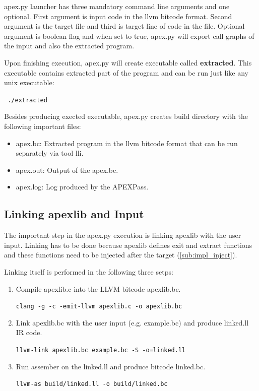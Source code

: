\documentclass[12pt, twoside]{fithesis2}
\renewcommand{\_}{\leavevmode \kern0.07em\vbox{\hrule width0.4em}}
\newcommand{\squarebullet}{\textcolor{black}{\raisebox{0.15em}{\rule{4pt}{4pt}}}}
\newenvironment{myItemize}{
  \begin{itemize}[
    leftmargin=2em,
    rightmargin=1em,
    itemsep=\parskip,
    parsep=0em,
    topsep=0em,
    partopsep=0em
]
  \renewcommand{\labelitemi}{\squarebullet}
  \renewcommand{\labelitemii}{\textbullet}
}{
  \end{itemize}
}
\newenvironment{myEnumerate}{
  \begin{enumerate}[
    leftmargin=2em,
    rightmargin=1em,
    itemsep=\parskip,
    parsep=0em,
    topsep=0em,
    partopsep=0em
]
}{
  \end{enumerate}
}
\begin{document}
apex.py launcher has three mandatory command line arguments and one optional.
First argument is input code in the llvm bitcode format. Second argument is the
target file and third is target line of code in the file.
Optional argument is boolean flag and when set to true, apex.py will
export call graphs of the input and also the extracted program.

Upon finishing execution, apex.py will create executable called
\textbf{extracted}. This executable contains extracted part of the program and
can be run just like any unix executable:

\texttt{
./extracted
}

Besides producing exected executable, apex.py creates build directory with the
following important files:

\begin{myItemize}
\item apex.bc: Extracted program in the llvm bitcode format that can be run separately
via tool lli.
\item apex.out: Output of the apex.bc.
\item apex.log: Log produced by the APEXPass.
\end{myItemize}

\subsection{Linking apexlib and Input}

The important step in the apex.py execution is linking apexlib with the user
input. Linking has to be done because apexlib defines exit and extract
functions and these functions need to be injected after the target
(\autoref{sub:impl_inject}).

Linking itself is performed in the following three setps:
\begin{myEnumerate}
\item Compile apexlib.c into the LLVM bitcode apexlib.bc.

\texttt{clang -g -c -emit-llvm apexlib.c -o apexlib.bc}

\item Link apexlib.bc with the user input (e.g. example.bc) and produce linked.ll
IR code.

\texttt{llvm-link apexlib.bc example.bc -S -o=linked.ll}

\item Run assember on the linked.ll and produce bitcode linked.bc.

\texttt{llvm-as build/linked.ll -o build/linked.bc}

\end{myEnumerate}
\end{document}
